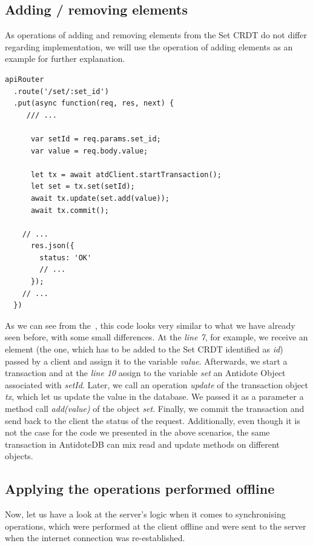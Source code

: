 \subsection*{Adding / removing elements}

As operations of adding and removing elements from the Set CRDT do not differ regarding implementation, we will use the operation of adding elements as an example for further explanation.

\begin{lstlisting}[caption={Code for applying an \textit{add} operation to a Set CRDT.}, label={lst:dev2}]
apiRouter
  .route('/set/:set_id')
  .put(async function(req, res, next) {
     /// ...

      var setId = req.params.set_id;
      var value = req.body.value;      

      let tx = await atdClient.startTransaction();
      let set = tx.set(setId);
      await tx.update(set.add(value));
      await tx.commit();

    // ...
      res.json({
        status: 'OK'
        // ...
      });
    // ...
  })
\end{lstlisting} 

As we can see from the~, this code looks very similar to what we have already seen before, with some small differences. At the \textit{line 7}, for example, we receive an element (the one, which has to be added to the Set CRDT identified as \textit{id}) passed by a client and assign it to the variable \textit{value}. Afterwards, we start a transaction and at the \textit{line 10} assign to the variable \textit{set} an Antidote Object associated with \textit{setId}. Later, we call an operation \textit{update} of the transaction object \textit{tx}, which let us update the value in the database. We passed it as a parameter a method call \textit{add(value)} of the object \textit{set}. Finally, we commit the transaction and send back to the client the status of the request. Additionally, even though it is not the case for the code we presented in the above scenarios, the same transaction in AntidoteDB can mix read and update methods on different objects.

\subsection*{Applying the operations performed offline}

Now, let us have a look at the server's logic when it comes to synchronising operations, which were performed at the client offline and were sent to the server when the internet connection was re-established.

